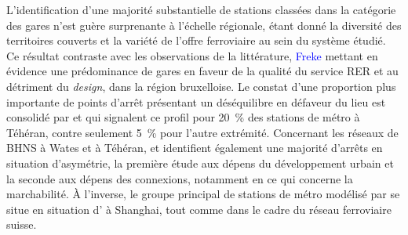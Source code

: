 \begin{refsegment}
L'identification d'une majorité substantielle de stations classées dans la catégorie des gares  n'est guère surprenante à l'échelle régionale, étant donné la diversité des territoires couverts et la variété de l'offre ferroviaire au sein du système étudié. Ce résultat contraste avec les observations de la littérature, \textcolor{blue}{Freke} \textcolor{blue}{\textcite[46]{caset_planning_2019}} mettant en évidence une prédominance de gares  en faveur de la qualité du service \acrfull{RER} et au détriment du \textsl{design}, dans la région bruxelloise. Le constat d'une proportion plus importante de points d'arrêt présentant un déséquilibre en défaveur du lieu est consolidé par \textcolor{blue}{\textcite[190]{kutty_assessment_2018}} et \textcolor{blue}{\textcite[19]{monajem_evaluation_2015}} qui signalent ce profil pour 20~\% des stations de métro à Téhéran, contre seulement 5~\% pour l'autre extrémité. Concernant les réseaux de \acrfull{BHNS} à Wates et à Téhéran, \textcolor{blue}{\textcite[15]{alfyan_node-place_2022}} et \textcolor{blue}{\textcite[13]{pezeshknejad_evaluating_2020}} identifient également une majorité d'arrêts en situation d'asymétrie, la première étude aux dépens du développement urbain et la seconde aux dépens des connexions, notamment en ce qui concerne la marchabilité. À l'inverse, le groupe principal de stations de métro modélisé par \textcolor{blue}{\textcite[12]{dou_integrating_2021}} se situe en situation d' à Shanghai, tout comme \textcolor{blue}{\textcite[197]{reusser_classifying_2008}} dans le cadre du réseau ferroviaire suisse.%


\end{refsegment}
